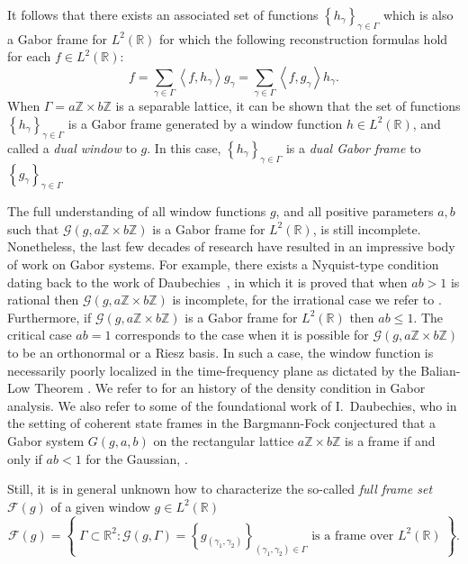 \documentclass{article}
\newcommand{\R}{\mathbb{R}}
\newcommand{\Z}{\mathbb{Z}}
\newcommand{\set}[1]{\ensuremath{\left\{#1\right\}}}
\newcommand{\ip}[1]{\ensuremath{\left\langle#1\right\rangle}}
\newcommand{\frameset}{\ensuremath{\mathcal{F}}}
\begin{document}
    

It follows that there exists an associated set of functions 
\(\set{h_{\gamma}}_{\gamma \in \Gamma}\) which is also a Gabor frame for \(L^2(\R)\) for which the following reconstruction formulas hold for each \(f \in L^2(\R)\):
\begin{equation}
	f = \sum_{\gamma \in \Gamma} \ip{f, h_{\gamma}} g_{\gamma}
	  = \sum_{\gamma \in \Gamma} \ip{f, g_{\gamma}} h_{\gamma}.
\end{equation}
 When $\Gamma =a \Z \times b \Z$ is a separable lattice, it can be shown that the set of functions \(\set{h_{\gamma}}_{\gamma \in \Gamma}\) is a Gabor frame generated by a window function $h \in L^2(\R)$, and called a \textit{dual window} to $g$. In this case,  \(\set{h_{\gamma}}_{\gamma \in \Gamma}\) is a \textit{dual Gabor frame} to \(\set{g_{\gamma}}_{\gamma \in \Gamma} \)

 The full understanding of all window functions $g$, and all positive parameters $a, b$ such that $\mathcal{G}(g, a\mathbb{Z}\times b\mathbb{Z})$ is a Gabor frame for $L^2(\R)$, is still incomplete. Nonetheless, the last few decades of research have resulted in an impressive body of work on Gabor systems. For example, there exists a Nyquist-type condition dating back to the work of Daubechies~\cite{daubechies1990wavelet}, in which it is proved that when $ab >1$ is rational then $\mathcal{G}(g, a\mathbb{Z}\times b\mathbb{Z})$ is incomplete, for the irrational case we refer to \cite{MR1096368}. Furthermore, if $\mathcal{G}(g, a\mathbb{Z}\times b\mathbb{Z})$ is a Gabor frame for $L^2(\R)$ then $ab \leq 1$. The critical case $ab =1$ corresponds to the case when it is possible for $\mathcal{G}(g, a\mathbb{Z}\times b\mathbb{Z})$ to be an orthonormal or a Riesz basis. In such a case, the window function is necessarily poorly localized in the time-frequency plane as dictated by the Balian-Low Theorem \cite{MR1350699}. 
We refer to \cite{heil2007history} for an history of the density condition in Gabor analysis. We also refer to some of the foundational work of I.~Daubechies, who in the setting of  coherent state frames in the Bargmann-Fock conjectured that a Gabor system $G(g,a,b)$ on the rectangular lattice $a\Z\times b\Z$ is a frame if and only if $ab<1$ for the Gaussian, \cite{daubechies1988frames}. 


Still, it is in general unknown how to characterize the so-called
\textit{full frame set} 
\(\frameset(g)\) of a given window \(g \in L^2(\R)\)
\begin{equation}
	\frameset(g) = \set{\;\Gamma \subset \R^2 : \mathcal{G}(g, \Gamma) =
		\set{g_{(\gamma_1, \gamma_2)}}_{(\gamma_1,\gamma_2) \in \Gamma}
		\text{ is a frame over } L^2(\R)\;}.
\end{equation}
\end{document}
